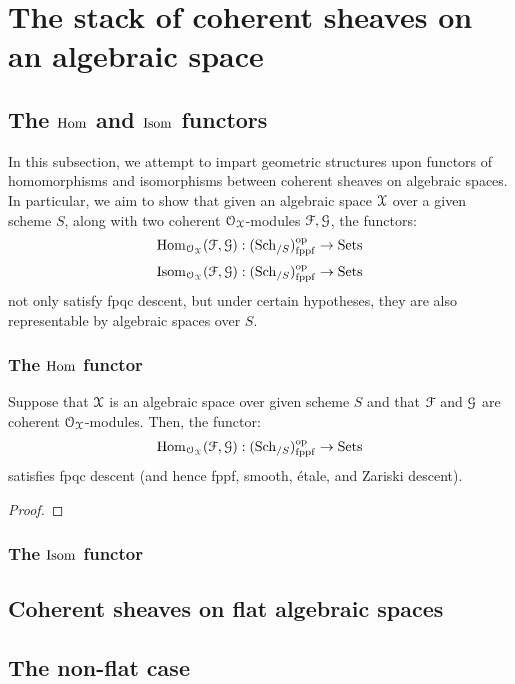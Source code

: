 \section{The stack of coherent sheaves on an algebraic space}
    \subsection{The \texorpdfstring{$\mathrm{Hom}$}{} and \texorpdfstring{$\mathrm{Isom}$}{} functors}
        In this subsection, we attempt to impart geometric structures upon functors of homomorphisms and isomorphisms between coherent sheaves on algebraic spaces. In particular, we aim to show that given an algebraic space $\mathcal{X}$ over a given scheme $S$, along with two coherent $\mathcal{O}_{\mathcal{X}}$-modules $\mathcal{F}, \mathcal{G}$, the functors:
            $$\mathrm{Hom}_{\mathcal{O}_{\mathcal{X}}}(\mathcal{F}, \mathcal{G}): (\mathrm{Sch}_{/S})_{\mathrm{fppf}}^{\mathrm{op}} \to \mathrm{Sets}$$
            $$\mathrm{Isom}_{\mathcal{O}_{\mathcal{X}}}(\mathcal{F}, \mathcal{G}): (\mathrm{Sch}_{/S})_{\mathrm{fppf}}^{\mathrm{op}} \to \mathrm{Sets}$$
        not only satisfy fpqc descent, but under certain hypotheses, they are also representable by algebraic spaces over $S$. 
        
        \subsubsection{The \texorpdfstring{$\mathrm{Hom}$}{} functor}
            \begin{proposition} \label{prop: hom_functors_satisfy_fpqc_descent}
                Suppose that $\mathcal{X}$ is an algebraic space over given scheme $S$ and that $\mathcal{F}$ and $\mathcal{G}$ are coherent $\mathcal{O}_{\mathcal{X}}$-modules. Then, the functor:
                    $$\mathrm{Hom}_{\mathcal{O}_{\mathcal{X}}}(\mathcal{F}, \mathcal{G}): (\mathrm{Sch}_{/S})_{\mathrm{fppf}}^{\mathrm{op}} \to \mathrm{Sets}$$
                satisfies fpqc descent (and hence fppf, smooth, \'etale, and Zariski descent). 
            \end{proposition}
                \begin{proof}
                
                \end{proof}
        
        \subsubsection{The \texorpdfstring{$\mathrm{Isom}$}{} functor}

    \subsection{Coherent sheaves on flat algebraic spaces}
    
    \subsection{The non-flat case}